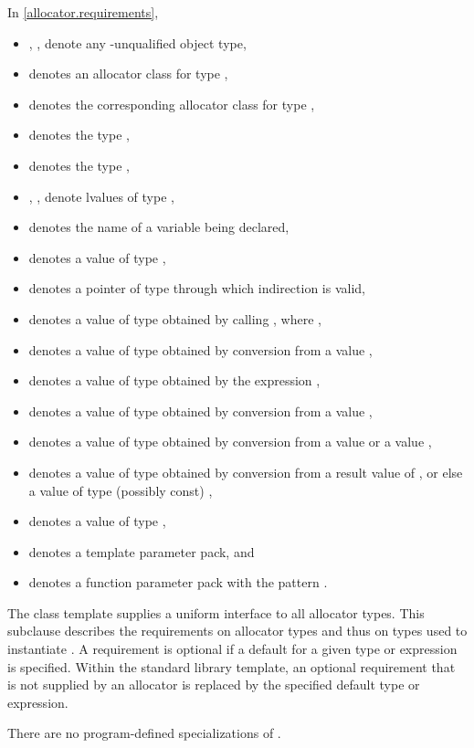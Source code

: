 \pnum
In \ref{allocator.requirements},
\begin{itemize}
\item
{}, ,  denote
any \cv-unqualified object type,
\item
{} denotes an allocator class for type ,
\item
{} denotes the corresponding allocator class for type ,
\item
{} denotes the type ,
\item
{} denotes the type ,
\item
{}, ,  denote lvalues of type ,
\item
{} denotes the name of a variable being declared,
\item
{} denotes a value of type ,
\item
{} denotes a pointer of type 
through which indirection is valid,
\item
{} denotes a value of type 
obtained by calling , where ,
\item
{} denotes a value of type 
obtained by conversion from a value ,
\item
{} denotes a value of type 
obtained by the expression ,
\item
{} denotes a value of type 
obtained by conversion from a value ,
\item
{} denotes a value of type 
obtained by conversion from a value  or a value ,
\item
{} denotes a value of type 
obtained by conversion from a result value of , or else
a value of type (possibly const) ,
\item
{} denotes a value of type ,
\item
{} denotes a template parameter pack, and
\item
{} denotes
a function parameter pack with the pattern .
\end{itemize}

\pnum
The class template  supplies
a uniform interface to all allocator types.
This subclause
describes the requirements on allocator types
and thus on types used to instantiate .
A requirement is optional if a default for a
given type or expression is specified.
Within the standard library 
template, an optional requirement that is not supplied by an allocator is
replaced by the specified default type or expression.
\begin{note}
There are no program-defined specializations of .
\end{note}

